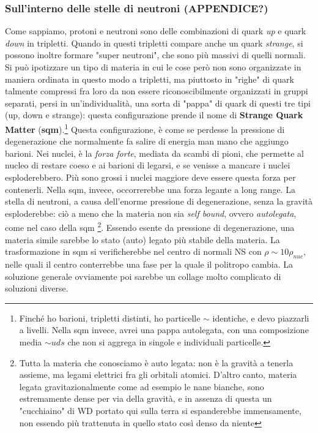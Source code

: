 \subsubsection{Sull'interno delle stelle di neutroni (APPENDICE?)}
Come sappiamo, protoni e neutroni sono delle combinazioni di quark \textit{up} e quark \textit{down} in tripletti.
Quando in questi tripletti compare anche un quark \textit{strange}, si possono inoltre formare "super neutroni", che sono più massivi di quelli normali.
Si può ipotizzare un tipo di materia in cui le cose però non sono organizzate in maniera ordinata in questo modo a tripletti, ma piuttosto in "righe" di quark talmente compressi fra loro da non essere riconoscibilmente organizzati in gruppi separati, persi in un'individualità, una sorta di "pappa" di quark di questi tre tipi (up, down e strange): questa configurazione prende il nome di \textbf{Strange Quark Matter} (\textbf{sqm}).\footnote{Finché ho barioni, tripletti distinti, ho particelle $\sim$ identiche, e devo piazzarli a livelli.
Nella sqm invece, avrei una pappa autolegata, con una composizione media $\sim uds$ che non si aggrega in singole e individuali particelle.}
Questa configurazione, è come se perdesse la pressione di degenerazione che normalmente fa salire di energia man mano che aggiungo barioni.
Nei nuclei, è la \textit{forza forte}, mediata da scambi di pioni, che permette al nucleo di restare coeso e ai barioni di legarsi, e se venisse a mancare i nuclei esploderebbero.
Più sono grossi i nuclei maggiore deve essere questa forza per contenerli.
Nella sqm, invece, occorrerebbe una forza legante a long range.
La stella di neutroni, a causa dell'enorme pressione di degenerazione, senza la gravità esploderebbe: ciò a meno che la materia non sia \textit{self bound}, ovvero \textit{autolegata}, come nel caso della sqm \footnote{Tutta la materia che conosciamo è auto legata: non è la gravità a tenerla assieme, ma legami elettrici fra gli orbitali atomici.
D'altro canto, materia legata gravitazionalmente come ad esempio le nane bianche, sono estremamente dense per via della gravità, e in assenza di questa un "cucchiaino" di WD portato qui sulla terra si espanderebbe immensamente, non essendo più trattenuta in quello stato così denso da niente}.
Essendo esente da pressione di degenerazione, una materia simile sarebbe lo stato (auto) legato più stabile della materia.
La trasformazione in sqm si verificherebbe nel centro di normali NS con $\rho \sim 10\rho_{nuc}$, nelle quali il centro conterrebbe una fase per la quale il politropo cambia.
La soluzione generale ovviamente poi sarebbe un collage molto complicato di soluzioni diverse.

